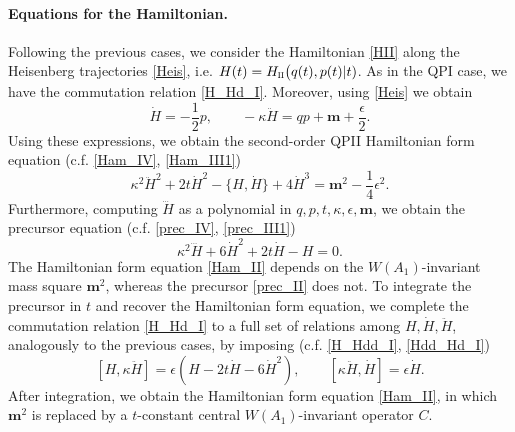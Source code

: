 \documentclass[12pt,a4paper]{article}
\numberwithin{equation}{section}
\newcommand{\II}{\scalebox{.6}{II}}
\begin{document}
\paragraph{Equations for the Hamiltonian.}
Following the previous cases, we consider the Hamiltonian \eqref{HII} along the Heisenberg trajectories \eqref{Heis}, i.e.  
$H(t)=H_{\II}\big(q(t),p(t)|t)$. As in the QPI case, we have the commutation relation \eqref{H_Hd_I}. Moreover, using \eqref{Heis} we obtain
\begin{equation}\label{Hder_II}
\dot{H}=-\frac12p,\qquad -\kappa \ddot{H}=qp+\boldsymbol{m}+\frac{\epsilon}2.
\end{equation}
Using these expressions, we obtain the second-order QPII Hamiltonian form equation (c.f. \eqref{Ham_IV}, \eqref{Ham_III1})
\begin{equation}\label{Ham_II}
\kappa^2\ddot{H}^2+2t\dot{H}^2-\{H,\dot{H}\}+4\dot{H}^3=\boldsymbol{m}^2-\frac14\epsilon^2.
\end{equation}
Furthermore, computing $\dddot{H}$ as a polynomial in $q,p,t,\kappa,\epsilon,\boldsymbol{m}$, we obtain the precursor equation (c.f. \eqref{prec_IV}, \eqref{prec_III1})
\begin{equation}\label{prec_II}
\kappa^2\dddot{H}+6\dot{H}^2+2t\dot{H}-H=0. 
\end{equation}
The Hamiltonian form equation \eqref{Ham_II} depends on the $W(A_1)$-invariant mass square $\boldsymbol{m}^2$, whereas the precursor \eqref{prec_II} does not.
To integrate the precursor in $t$ and recover the Hamiltonian form equation, we complete the commutation relation \eqref{H_Hd_I} to a full set of relations among $H,\dot{H},\ddot{H}$, analogously to the previous cases, by imposing (c.f. \eqref{H_Hdd_I}, \eqref{Hdd_Hd_I}) 
\begin{equation}\label{triple_II}
[H,\kappa \ddot{H}]=\epsilon\left(H-2t\dot{H}-6\dot{H}^2\right), \qquad [\kappa \ddot{H},\dot{H}]=\epsilon\dot{H}.
\end{equation}
After integration, we obtain the Hamiltonian form equation \eqref{Ham_II}, in which $\boldsymbol{m}^2$ is replaced by a $t$-constant central $W(A_1)$-invariant operator $C$. 
\end{document}
